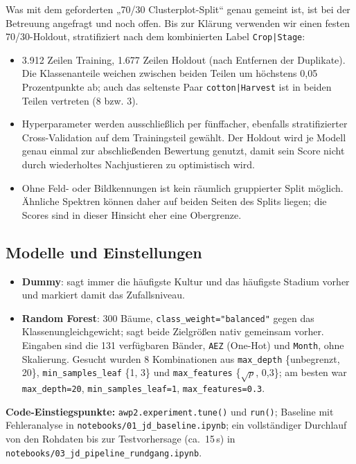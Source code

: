 \documentclass[11pt,a4paper]{article}
\begin{document}
Was mit dem geforderten „70/30 Clusterplot-Split“ genau gemeint ist, ist bei der Betreuung
angefragt und noch offen. Bis zur Klärung verwenden wir einen festen 70/30-Holdout,
stratifiziert nach dem kombinierten Label \texttt{Crop|Stage}:

\begin{itemize}
  \item 3.912 Zeilen Training, 1.677 Zeilen Holdout (nach Entfernen der Duplikate). Die
        Klassenanteile weichen zwischen beiden Teilen um höchstens 0,05 Prozentpunkte ab; auch
        das seltenste Paar \texttt{cotton|Harvest} ist in beiden Teilen vertreten (8 bzw. 3).
  \item Hyperparameter werden ausschließlich per fünffacher, ebenfalls stratifizierter
        Cross-Validation auf dem Trainingsteil gewählt. Der Holdout wird je Modell genau einmal
        zur abschließenden Bewertung genutzt, damit sein Score nicht durch wiederholtes
        Nachjustieren zu optimistisch wird.
  \item Ohne Feld- oder Bildkennungen ist kein räumlich gruppierter Split möglich. Ähnliche
        Spektren können daher auf beiden Seiten des Splits liegen; die Scores sind in dieser
        Hinsicht eher eine Obergrenze.
\end{itemize}

\subsection{Modelle und Einstellungen}

\begin{itemize}
  \item \textbf{Dummy}: sagt immer die häufigste Kultur und das häufigste Stadium vorher und
        markiert damit das Zufallsniveau.
  \item \textbf{Random Forest}: 300 Bäume, \texttt{class\_weight="balanced"} gegen das
        Klassenungleichgewicht; sagt beide Zielgrößen nativ gemeinsam vorher. Eingaben sind die
        131 verfügbaren Bänder, \texttt{AEZ} (One-Hot) und \texttt{Month}, ohne Skalierung.
        Gesucht wurden 8 Kombinationen aus \texttt{max\_depth} \{unbegrenzt, 20\},
        \texttt{min\_samples\_leaf} \{1, 3\} und \texttt{max\_features} \{$\sqrt{p}$, 0,3\};
        am besten war \texttt{max\_depth=20}, \texttt{min\_samples\_leaf=1},
        \texttt{max\_features=0.3}.
\end{itemize}

\textbf{Code-Einstiegspunkte:} \texttt{awp2.experiment.tune()} und \texttt{run()};
Baseline mit Fehleranalyse in \texttt{notebooks/01\_jd\_baseline.ipynb}; ein vollständiger
Durchlauf von den Rohdaten bis zur Testvorhersage (ca.\ 15\,s) in
\texttt{notebooks/03\_jd\_pipeline\_rundgang.ipynb}.
\end{document}
